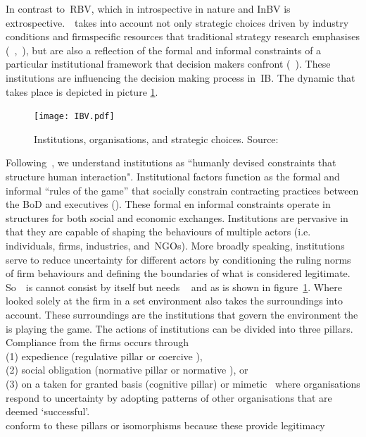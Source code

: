 In contrast to~\gls{RBV}, which in introspective in nature and \gls{InBV} is extrospective.~\ibv~takes into 
account not only strategic choices driven by industry conditions and firm\-specific resources that 
traditional strategy research emphasises (~\cite{Porter:1980},~\cite{Barney:1991}), but are also a 
reflection of the formal and informal constraints of a particular institutional framework that decision
makers confront (~\cite{Oliver:1997,Scott:1995}). These institutions are influencing the decision making process in~\gls{IB}.  The dynamic that takes place is depicted in picture \ref{fig:ibv}. 

\begin{figure}[htbp!] 
	\centering
	\texttt{[image: IBV.pdf]}
 	\caption{Institutions, organisations, and strategic choices. Source: \cite{Peng:2000}}
	\label{fig:ibv}
\end{figure}



Following~\cite{North:1990}, we understand institutions as ``humanly devised constraints
that structure human interaction". Institutional factors function as the formal and
informal ``rules of the game'' that socially constrain contracting practices between the \gls{BoD} and 
executives (\cite{North:1990}).  
These formal en informal constraints operate in structures for both social and economic exchanges. 
Institutions are pervasive in that they are capable of shaping the behaviours of multiple actors (i.e. 
individuals, firms, industries, and~\glspl{NGO}). More broadly speaking, institutions serve to reduce 
uncertainty for different actors by conditioning the ruling norms of firm behaviours and defining the 
boundaries of what is considered legitimate.~\cite{Peng:2008}\\

So~\ibv~is cannot consist by itself but needs \rbv~\cite{Barney:1991} and \cite{Porter:1980} as is shown in figure~\ref{fig:ibv}. 
Where \rbv looked solely at the firm in a set environment \ibv also takes the surroundings into account. These surroundings are the institutions that govern the environment the \mne is playing the game. 
The actions of institutions can be divided into three pillars. Compliance from the firms occurs through \\(1) expedience (regulative pillar or coercive \iso),\\
 (2) social obligation (normative pillar or normative \iso), or \\
 (3) on a taken for granted basis (cognitive pillar) or mimetic \iso~where organisations respond to uncertainty by adopting patterns of other organisations that are deemed `successful'\cite{Westney:2005,Peng:2008,Kostova:1999,DiMaggio:1983,Scott:1995}.\\ 
\mne conform to these pillars or isomorphisms because these provide legitimacy~\cite{Powell:1991}

